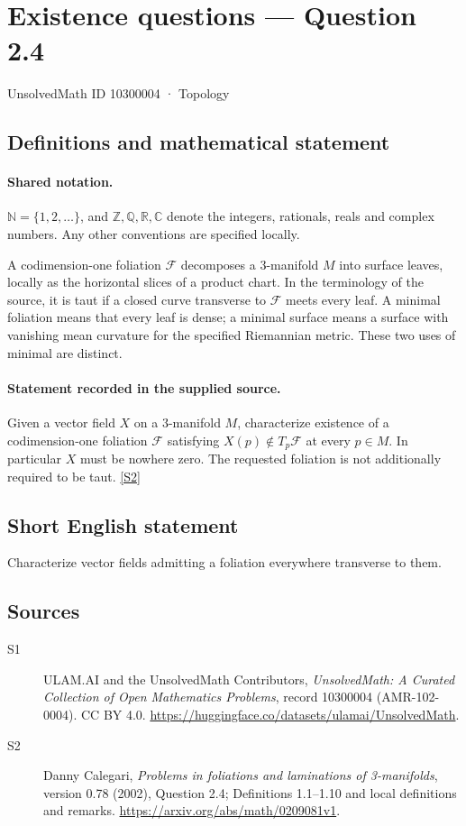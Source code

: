 \documentclass[11pt]{article}
\newcommand{\sref}[2]{\hyperlink{source:#1:#2}{[S#2]}}
\begin{document}
\setcounter{section}{10300003}
\section{Existence questions — Question 2.4}\label{10300004}
{\small\sffamily UnsolvedMath ID 10300004 · Topology}
\subsection{Definitions and mathematical statement}

\paragraph{Shared notation.}$\mathbb N=\{1,2,\ldots\}$, and $\mathbb Z,\mathbb Q,\mathbb R,\mathbb C$ denote the integers, rationals, reals and complex numbers. Any other conventions are specified locally.


A codimension-one foliation $\mathcal F$ decomposes a $3$-manifold $M$ into surface leaves, locally as the horizontal slices of a product chart. In the terminology of the source, it is taut if a closed curve transverse to $\mathcal F$ meets every leaf. A minimal foliation means that every leaf is dense; a minimal surface means a surface with vanishing mean curvature for the specified Riemannian metric. These two uses of minimal are distinct.
\paragraph{Statement recorded in the supplied source.}
Given a vector field $X$ on a $3$-manifold $M$, characterize existence of a codimension-one foliation $\mathcal F$ satisfying $X(p)\notin T_p\mathcal F$ at every $p\in M$. In particular $X$ must be nowhere zero. The requested foliation is not additionally required to be taut. \sref{10300004}{2}
\subsection{Short English statement}
Characterize vector fields admitting a foliation everywhere transverse to them.
\subsection{Sources}
\begin{description}
\item[\hypertarget{source:10300004:1}{S1}] ULAM.AI and the UnsolvedMath Contributors, \emph{UnsolvedMath: A Curated Collection of Open Mathematics Problems}, record 10300004 (AMR-102-0004). CC BY 4.0. \url{https://huggingface.co/datasets/ulamai/UnsolvedMath}.
\item[\hypertarget{source:10300004:2}{S2}] Danny Calegari, \emph{Problems in foliations and laminations of 3-manifolds}, version 0.78 (2002), Question 2.4; Definitions 1.1--1.10 and local definitions and remarks. \url{https://arxiv.org/abs/math/0209081v1}.
\end{description}
\label{end:10300004}
\end{document}
